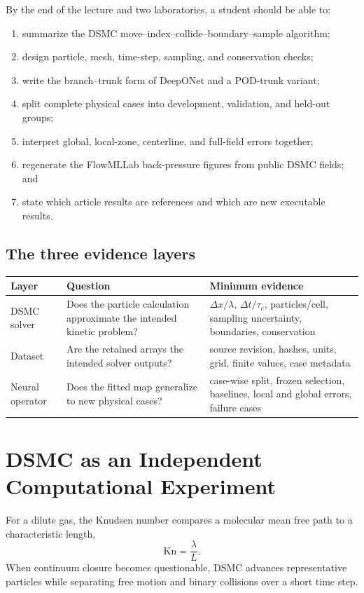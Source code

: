 \documentclass[11pt]{article}
\newcommand{\Kn}{\mathrm{Kn}}
\begin{document}
\begin{learningbox}
By the end of the lecture and two laboratories, a student should be able to:
\begin{enumerate}
\item summarize the DSMC move--index--collide--boundary--sample algorithm;
\item design particle, mesh, time-step, sampling, and conservation checks;
\item write the branch--trunk form of DeepONet and a POD-trunk variant;
\item split complete physical cases into development, validation, and held-out groups;
\item interpret global, local-zone, centerline, and full-field errors together;
\item regenerate the FlowMLLab back-pressure figures from public DSMC fields; and
\item state which article results are references and which are new executable results.
\end{enumerate}
\end{learningbox}

\subsection{The three evidence layers}
\begin{center}
\begin{tabular}{p{}p{}p{}}
\toprule
Layer & Question & Minimum evidence \\
\midrule
DSMC solver & Does the particle calculation approximate the intended kinetic problem? & $\Delta x/\lambda$, $\Delta t/\tau_c$, particles/cell, sampling uncertainty, boundaries, conservation \\
Dataset & Are the retained arrays the intended solver outputs? & source revision, hashes, units, grid, finite values, case metadata \\
Neural operator & Does the fitted map generalize to new physical cases? & case-wise split, frozen selection, baselines, local and global errors, failure cases \\
\bottomrule
\end{tabular}
\end{center}

\clearpage
\section{DSMC as an Independent Computational Experiment}
For a dilute gas, the Knudsen number compares a molecular mean free path to a
characteristic length,
\begin{equation}
\Kn=\frac{\lambda}{L}.
\end{equation}
When continuum closure becomes questionable, DSMC advances representative
particles while separating free motion and binary collisions over a short time
step.
\end{document}
